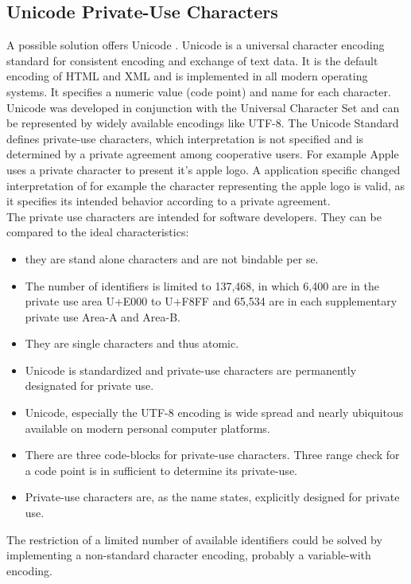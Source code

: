 \subsection{Unicode Private-Use Characters}
A possible solution offers Unicode \cite{Unicode}. Unicode is a universal character encoding standard for consistent encoding and exchange of text data. It is the default encoding of HTML and XML and is implemented in all modern operating systems. It specifies a numeric value (code point) and name for each character. Unicode was developed in conjunction with the Universal Character Set and can be represented by widely available encodings like UTF-8. The Unicode Standard defines private-use characters, which interpretation is not specified and is determined by a private agreement among cooperative users. For example Apple uses a private character to present it's apple logo. A application specific changed interpretation of for example the character representing the apple logo is valid, as it specifies its intended behavior according to a private agreement.\\
The private use characters are intended for software developers. They can be compared to the ideal characteristics:
\begin{itemize}
	\item they are stand alone characters and are not bindable per se.
	\item The number of identifiers is limited to 137,468, in which 6,400 are in the private use area U+E000 to U+F8FF and 65,534 are in each supplementary private use Area-A and Area-B. 
	\item They are single characters and thus atomic. 
	\item Unicode is standardized and private-use characters are permanently designated for private use.
	\item Unicode, especially the UTF-8 encoding is wide spread and nearly ubiquitous available on modern personal computer platforms.
	\item There are three code-blocks for private-use characters. Three range check for a code point is in sufficient to determine its private-use.
	\item Private-use characters are, as the name states, explicitly designed for private use.
\end{itemize}
The restriction of a limited number of available identifiers could be solved by implementing a non-standard character encoding, probably a variable-with encoding.


